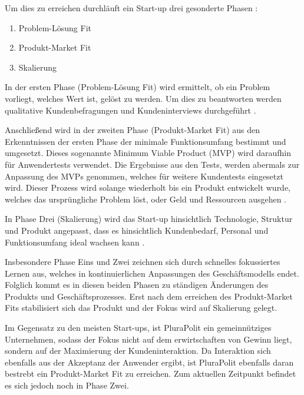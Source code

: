 Um dies zu erreichen durchläuft ein Start-up drei gesonderte Phasen \parencite[vgl.][S. 8 f.]{maurya_running_2012}: 
\begin{enumerate}
	\item Problem-Lösung Fit
	\item Produkt-Market Fit
	\item Skalierung
\end{enumerate}

In der ersten Phase (Problem-Lösung Fit) wird ermittelt, ob ein Problem vorliegt, welches Wert ist, gelöst zu werden. Um dies zu beantworten werden qualitative Kundenbefragungen und Kundeninterviews durchgeführt \parencite[vgl.][S. 170 ff.]{croll_lean_2013}.

Anschließend wird in der zweiten Phase (Produkt-Market Fit) aus den Erkenntnissen der ersten Phase der minimale Funktionsumfang bestimmt und umgesetzt. Dieses sogenannte Minimum Viable Product (MVP) wird daraufhin für Anwendertests verwendet. Die Ergebnisse aus den Tests, werden abermals zur Anpassung des MVPs genommen, welches für weitere Kundentests eingesetzt wird. Dieser Prozess wird solange wiederholt bis ein Produkt entwickelt wurde, welches das ursprüngliche Problem löst, oder Geld und Ressourcen ausgehen \parencite[vgl.][S. 28]{croll_lean_2013}.

In Phase Drei (Skalierung) wird das Start-up hinsichtlich Technologie, Struktur und Produkt angepasst, dass es hinsichtlich Kundenbedarf, Personal und Funktionsumfang ideal wachsen kann \parencite[vgl.][S. 9]{maurya_running_2012}.

Insbesondere Phase Eins und Zwei zeichnen sich durch schnelles fokussiertes Lernen aus, welches in kontinuierlichen Anpassungen des Geschäftsmodells endet. Folglich kommt es in diesen beiden Phasen zu ständigen Änderungen des Produkts und Geschäftsprozesses. Erst nach dem erreichen des Produkt-Market Fits stabilisiert sich das Produkt und der Fokus wird auf Skalierung gelegt.

Im Gegensatz zu den meisten Start-ups, ist PluraPolit ein gemeinnütziges Unternehmen, sodass der Fokus nicht auf dem erwirtschaften von Gewinn liegt, sondern auf der Maximierung der Kundeninteraktion. Da Interaktion sich ebenfalls aus der Akzeptanz der Anwender ergibt, ist PluraPolit ebenfalls daran bestrebt ein Produkt-Market Fit zu erreichen. Zum aktuellen Zeitpunkt befindet es sich jedoch noch in Phase Zwei.
